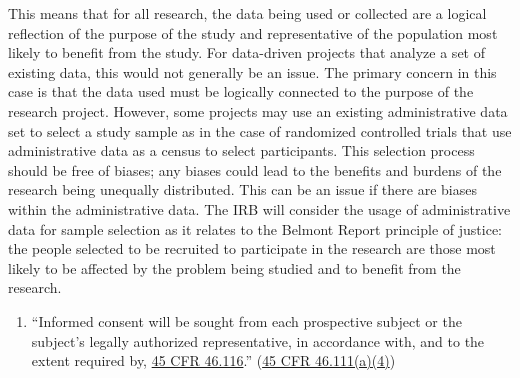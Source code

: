This means that for all research, the data being used or collected are a logical reflection of the purpose of the study and representative of the population most likely to benefit from the study. For data-driven projects that analyze a set of existing data, this would not generally be an issue. The primary concern in this case is that the data used must be logically connected to the purpose of the research project. However, some projects may use an existing administrative data set to select a study sample as in the case of randomized controlled trials that use administrative data as a census to select participants. This selection process should be free of biases; any biases could lead to the benefits and burdens of the research being unequally distributed. This can be an issue if there are biases within the administrative data. The IRB will consider the usage of administrative data for sample selection as it relates to the Belmont Report principle of justice: the people selected to be recruited to participate in the research are those most likely to be affected by the problem being studied and to benefit from the research.

\begin{enumerate}
\def\labelenumi{(\arabic{enumi})}
\setcounter{enumi}{3}
\tightlist
\item
  ``Informed consent will be sought from each prospective subject or the subject's legally authorized representative, in accordance with, and to the extent required by, \href{https://www.law.cornell.edu/cfr/text/45/46.116}{45 CFR 46.116}.'' (\href{https://www.law.cornell.edu/cfr/text/45/46.111}{45 CFR 46.111(a)(4)})
\end{enumerate}

